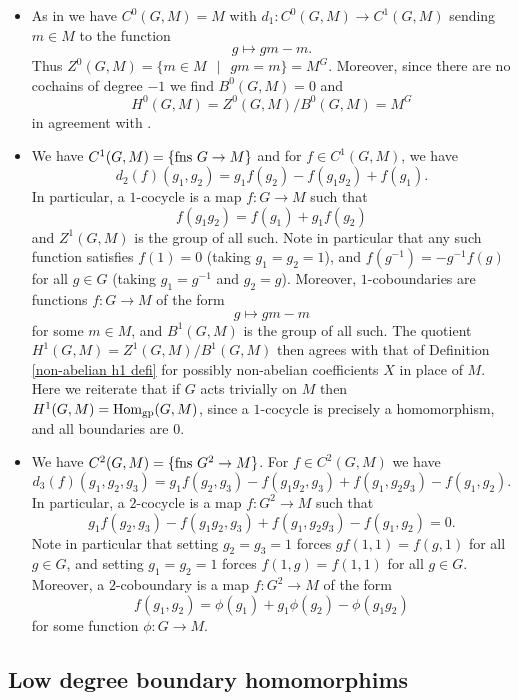 \documentclass[11pt]{amsart}
\numberwithin{equation}{section}
\theoremstyle{remark}
\theoremstyle{remark}
\theoremstyle{remark}
\theoremstyle{definition}
\theoremstyle{definition}
\theoremstyle{definition}
\theoremstyle{definition}
\theoremstyle{definition}
\theoremstyle{definition}
\begin{document}
\begin{itemize}
\item 

As in  we have $C^0(G,M)=M$ with $d_1:C^0(G,M)\rightarrow C^1(G,M)$ sending $m\in M$ to the function 
\[g\mapsto gm-m.\]
Thus $Z^0(G,M)=\{m\in M~~\mid~~gm=m\}=M^G$.
Moreover, since there are no cochains of degree $-1$ we find $B^0(G,M)=0$ and
\[H^0(G,M)=Z^0(G,M)/B^0(G,M)=M^G\]
in agreement with  .\\
  
\item

We have $C^1(G,M)=\{\textup{fns }G\rightarrow M\}$ and for $f\in C^1(G,M)$, we have
\[d_2(f)(g_1,g_2)=g_1f(g_2)-f(g_1g_2)+f(g_1).\]
In particular, a $1$-cocycle is a map $f:G\rightarrow M$ such that
\[f(g_1g_2)=f(g_1)+g_1f(g_2)\]
and $Z^1(G,M)$ is the group of all such. Note in particular that any such function satisfies $f(1)=0$ (taking $g_1=g_2=1$), and $f(g^{-1})=-g^{-1}f(g)$ for all $g\in G$ (taking $g_1=g^{-1}$ and $g_2=g$).
Moreover, $1$-coboundaries are functions $f:G\rightarrow M$ of the form
\[g\mapsto gm-m\]
for some $m\in M$, and $B^1(G,M)$ is the group of all such. 
The quotient $H^1(G,M)=Z^1(G,M)/B^1(G,M)$ then agrees with that of Definition \ref{non-abelian h1 defi} for possibly non-abelian coefficients $X$ in place of $M$. Here we reiterate that if $G$ acts trivially on $M$ then $H^1(G,M)=\textup{Hom}_{\textup{gp}}(G,M)$, since a $1$-cocycle is precisely a homomorphism, and all boundaries are $0$.\\

\item 
We have $C^2(G,M)=\{\textup{fns }G^2\rightarrow M\}$. For $f\in C^2(G,M)$ we have
\[d_3(f)(g_1,g_2,g_3)=g_1f(g_2,g_3)-f(g_1g_2,g_3)+f(g_1,g_2g_3)-f(g_1,g_2).\]
In particular, a $2$-cocycle is a map $f:G^2\rightarrow M$ such that
\begin{equation}\label{2 cocycle condition}
g_1f(g_2,g_3)-f(g_1g_2,g_3)+f(g_1,g_2g_3)-f(g_1,g_2)=0.
\end{equation}
Note in particular that setting $g_2=g_3=1$ forces
$gf(1,1)=f(g,1)$
for all $g\in G$,
and setting $g_1=g_2=1$ forces
$f(1,g)=f(1,1)$
for all $g\in G$.
Moreover, a $2$-coboundary is a map $f:G^2\rightarrow M$ of the form
\[f(g_1,g_2)=\phi(g_1)+g_1\phi(g_2)-\phi(g_1g_2)\]
for some function $\phi:G\rightarrow M$. 
\end{itemize}

\subsection{Low degree boundary homomorphims}
\end{document}
